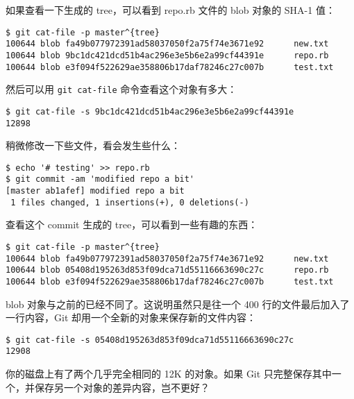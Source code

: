 \documentclass[a4paper]{book}
\begin{document}
如果查看一下生成的 tree，可以看到 repo.rb 文件的 blob 对象的 SHA-1 值：

\begin{shaded}\begin{verbatim}
$ git cat-file -p master^{tree}
100644 blob fa49b077972391ad58037050f2a75f74e3671e92      new.txt
100644 blob 9bc1dc421dcd51b4ac296e3e5b6e2a99cf44391e      repo.rb
100644 blob e3f094f522629ae358806b17daf78246c27c007b      test.txt
\end{verbatim}\end{shaded}

然后可以用 \texttt{git cat-file} 命令查看这个对象有多大：

\begin{shaded}\begin{verbatim}
$ git cat-file -s 9bc1dc421dcd51b4ac296e3e5b6e2a99cf44391e
12898
\end{verbatim}\end{shaded}

稍微修改一下些文件，看会发生些什么：

\begin{shaded}\begin{verbatim}
$ echo '# testing' >> repo.rb
$ git commit -am 'modified repo a bit'
[master ab1afef] modified repo a bit
 1 files changed, 1 insertions(+), 0 deletions(-)
\end{verbatim}\end{shaded}

查看这个 commit 生成的 tree，可以看到一些有趣的东西：

\begin{shaded}\begin{verbatim}
$ git cat-file -p master^{tree}
100644 blob fa49b077972391ad58037050f2a75f74e3671e92      new.txt
100644 blob 05408d195263d853f09dca71d55116663690c27c      repo.rb
100644 blob e3f094f522629ae358806b17daf78246c27c007b      test.txt
\end{verbatim}\end{shaded}

blob 对象与之前的已经不同了。这说明虽然只是往一个 400 行的文件最后加入了一行内容，Git 却用一个全新的对象来保存新的文件内容：

\begin{shaded}\begin{verbatim}
$ git cat-file -s 05408d195263d853f09dca71d55116663690c27c
12908
\end{verbatim}\end{shaded}

你的磁盘上有了两个几乎完全相同的 12K 的对象。如果 Git 只完整保存其中一个，并保存另一个对象的差异内容，岂不更好？
\end{document}
